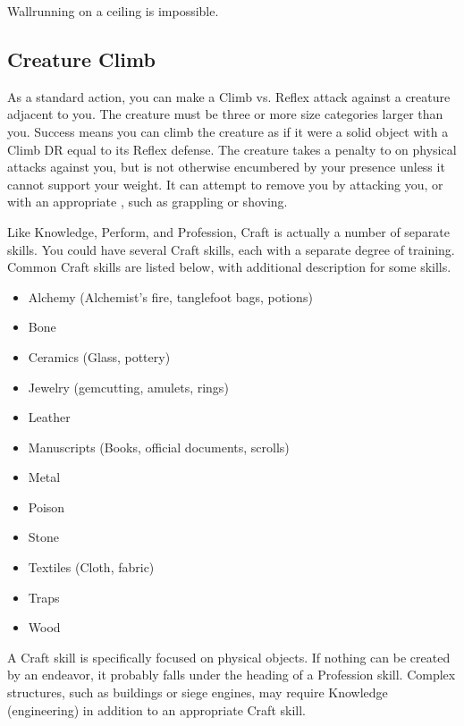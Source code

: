         Wallrunning on a ceiling is impossible.

    \subsection{Creature Climb}
        As a standard action, you can make a Climb vs. Reflex attack against a creature adjacent to you.
        The creature must be three or more size categories larger than you.
        Success means you can climb the creature as if it were a solid object with a Climb DR equal to its Reflex defense.
        The creature takes a  penalty to  on physical attacks against you, but is not otherwise encumbered by your presence unless it cannot support your weight.
        It can attempt to remove you by attacking you, or with an appropriate , such as grappling or shoving.

\newpage
{}
        Like Knowledge, Perform, and Profession, Craft is actually a number of separate skills.
        You could have several Craft skills, each with a separate degree of training.
        Common Craft skills are listed below, with additional description for some skills.

        \begin{itemize}
            \item Alchemy (Alchemist's fire, tanglefoot bags, potions)
            \item Bone
            \item Ceramics (Glass, pottery)
            \item Jewelry (gemcutting, amulets, rings)
            \item Leather
            \item Manuscripts (Books, official documents, scrolls)
            \item Metal
            \item Poison
            \item Stone
            \item Textiles (Cloth, fabric)
            \item Traps
            \item Wood
        \end{itemize}


        A Craft skill is specifically focused on physical objects. If nothing can be created by an endeavor, it probably falls under the heading of a Profession skill. Complex structures, such as buildings or siege engines, may require Knowledge (engineering) in addition to an appropriate Craft skill.

